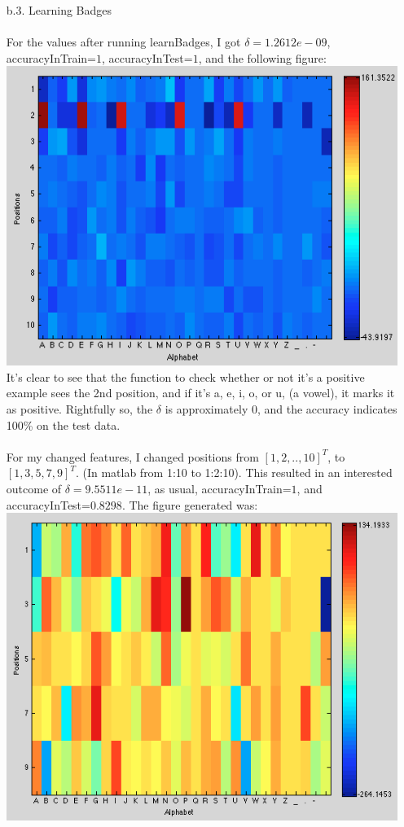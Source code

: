 \begin{enumerate}
\begin{enumerate}
        \item[b.3.] Learning Badges\\\\
                For the values after running learnBadges, I got $\delta = 1.2612e-09$, accuracyInTrain=$1$, accuracyInTest=$1$, and the following figure:\\
                \includegraphics[scale=0.5]{learnBadges}\\
                It's clear to see that the function to check whether or not it's a positive example sees the 2nd position, and if it's a, e, i, o, or u, (a vowel), it marks it as positive. Rightfully so, the $\delta$ is approximately $0$, and the accuracy indicates 100\% on the test data.\\\\
                For my changed features, I changed positions from $[1,2,..,10]^T$, to $[1,3,5,7,9]^T$. (In matlab from 1:10 to 1:2:10). This resulted in an interested outcome of $\delta = 9.5511e-11$, as usual, accuracyInTrain=$1$, and accuracyInTest=$0.8298$. The figure generated was:\\
                \includegraphics[scale=0.5]{learnBadges2}\\

\end{enumerate}
\end{enumerate}
